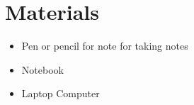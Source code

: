 \documentclass[main.tex]{subfiles}
\begin{document}
\section*{Materials}
\vspace{0.125in}
\begin{itemize}
  \item Pen or pencil for note for taking notes 
  \item Notebook 
  \item Laptop Computer 
\end{itemize}
\end{document}
